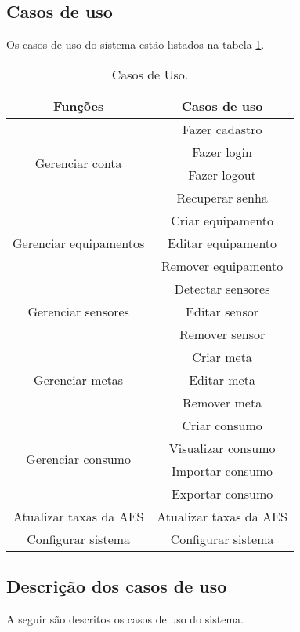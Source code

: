 \subsection{Casos de uso}

Os casos de uso do sistema estão listados na tabela \ref{tab:casos_de_uso}.

\begin{table}
\centering
{\renewcommand{\arraystretch}{1.5}
\renewcommand{\tabcolsep}{0.2cm}
\begin{tabular}{|c|c|}
\hline
\textbf{Funções} & \textbf{Casos de uso} \\
\hline
\multirow{4}{*}{Gerenciar conta} & Fazer cadastro\\
& Fazer login\\
& Fazer logout\\
& Recuperar senha\\
\hline
\multirow{3}{*}{Gerenciar equipamentos} & Criar equipamento\\
& Editar equipamento\\
& Remover equipamento\\
\hline
\multirow{3}{*}{Gerenciar sensores} & Detectar sensores\\
& Editar sensor\\
& Remover sensor\\
\hline
\multirow{3}{*}{Gerenciar metas} & Criar meta\\
& Editar meta\\
& Remover meta\\
\hline
\multirow{4}{*}{Gerenciar consumo} & Criar consumo\\
& Visualizar consumo\\
& Importar consumo\\
& Exportar consumo\\
\hline
Atualizar taxas da AES & Atualizar taxas da AES\\
\hline
Configurar sistema & Configurar sistema\\
\hline
\end{tabular}}
\caption{\label{tab:casos_de_uso} Casos de Uso.}
\end{table}
%
\subsection{Descrição dos casos de uso}

A seguir são descritos os casos de uso do sistema. 

